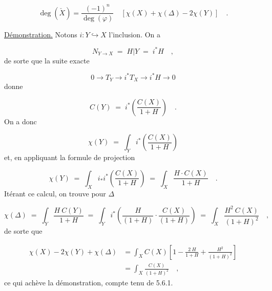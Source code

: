 \begin{equation}\tag{5.7.3}
\deg(\check{X}) = \frac{(-1)^n}{\deg(\varphi)} \quad \left[ \chi(X) + \chi(\Delta) - 2\chi(Y) \right] \quad .
\end{equation}


\underline{Démonstration.} \quad Notons $i : Y \hookrightarrow X$ l'inclusion. On a

\begin{equation*}
N_{Y \longrightarrow X} \;=\; H|Y \;=\; i^{*}H \quad ,
\end{equation*}
de sorte que la suite exacte

\begin{equation*}
0 \longrightarrow T_Y \longrightarrow i^{*}T_X \longrightarrow i^{*}H \longrightarrow 0
\end{equation*}
donne

\begin{equation}\tag{5.7.4}
C(Y) \;=\; i^{*} \left( \frac{C(X)}{1+H} \right) \quad .
\end{equation}
On a donc

\begin{equation*}
\chi(Y) \;=\; \int_Y i^{*} \left( \frac{C(X)}{1+H} \right)
\end{equation*}
et, en appliquant la formule de projection

\begin{equation}\tag{5.7.5}
\chi(Y) \;=\; \int_X i_{*}i^{*} \left( \frac{C(X)}{1+H} \right) \;=\; \int_X \frac{H \cdot C(X)}{1 + H} \quad .
\end{equation}
Itérant ce calcul, on trouve pour $\Delta$

\begin{equation}\tag{5.7.6}
\chi(\Delta) \;=\; \int_Y \frac{H\ C(Y)}{1 + H} \;=\; \int_Y i^{*} \left( \frac{H}{(1+H)} \cdot \frac{C(X)}{(1+H)} \right) \;=\; \int_X \frac{H^2\ C(X)}{(1+H)^2} \quad ,
\end{equation}
de sorte que

\begin{equation*}
\begin{aligned} \chi(X) - 2\chi(Y)+\chi(\Delta) &= \int_X C(X) \left[ 1 - \frac{2\ H}{1+H} + \frac{H^2}{(1+H)^2} \right] \\ &= \int_X \frac{C(X)}{(1 + H)^2} \quad , \end{aligned}
\end{equation*}
ce qui achève la démonstration, compte tenu de 5.6.1.


